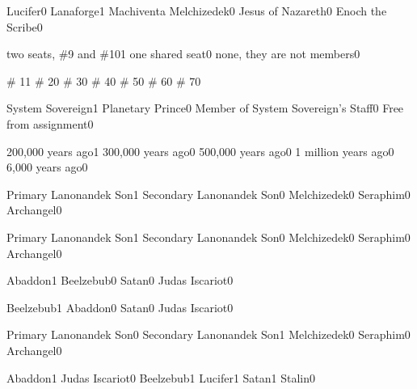 {Lucifer}{0}
{Lanaforge}{1}
{Machiventa Melchizedek}{0}
{Jesus of Nazareth}{0}
{Enoch the Scribe}{0}
\qstop

{two seats, \#9 and \#10}{1}
{one shared seat}{0}
{none, they are not members}{0}
\qstop



{\# 1}{1}
{\# 2}{0}
{\# 3}{0}
{\# 4}{0}
{\# 5}{0}
{\# 6}{0}
{\# 7}{0}
\qstop







{System Sovereign}{1}
{Planetary Prince}{0}
{Member of System Sovereign's Staff}{0}
{Free from assignment}{0}
\qstop

{200,000 years ago}{1}
{300,000 years ago}{0}
{500,000 years ago}{0}
{1 million years ago}{0}
{6,000 years ago}{0}
\qstop

{Primary Lanonandek Son}{1}
{Secondary Lanonandek Son}{0}
{Melchizedek}{0}
{Seraphim}{0}
{Archangel}{0}
\qstop

{Primary Lanonandek Son}{1}
{Secondary Lanonandek Son}{0}
{Melchizedek}{0}
{Seraphim}{0}
{Archangel}{0}
\qstop

{Abaddon}{1}
{Beelzebub}{0}
{Satan}{0}
{Judas Iscariot}{0}
\qstop

{Beelzebub}{1}
{Abaddon}{0}
{Satan}{0}
{Judas Iscariot}{0}
\qstop

{Primary Lanonandek Son}{0}
{Secondary Lanonandek Son}{1}
{Melchizedek}{0}
{Seraphim}{0}
{Archangel}{0}
\qstop

{Abaddon}{1}
{Judas Iscariot}{0}
{Beelzebub}{1}
{Lucifer}{1}
{Satan}{1}
{Stalin}{0}
\qstop

